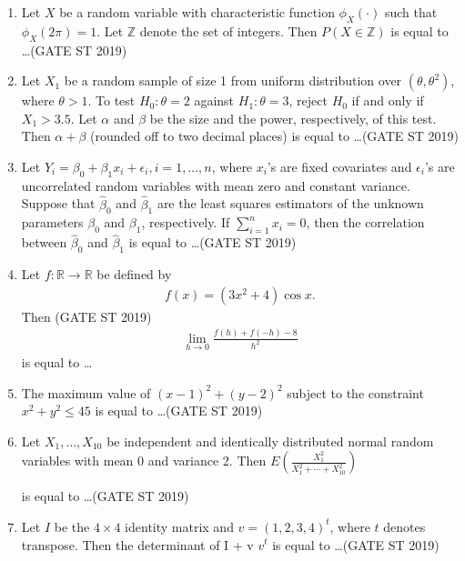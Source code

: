 \documentclass[journal]{IEEEtran}
\begin{document}
\begin{enumerate}[start=1]
\item Let \(X\) be a random variable with characteristic function \(\phi_X(\cdot)\) such that \(\phi_X(2 \pi) = 1\). Let \(\mathbb{Z}\) denote the set of integers. Then \(P(X \in \mathbb{Z})\) is equal to \ldots \hfill(GATE ST 2019)

\item Let \(X_1\) be a random sample of size 1 from uniform distribution over \((\theta, \theta^2)\), where \(\theta > 1\). To test \(H_0: \theta = 2\) against \(H_1: \theta = 3\), reject \(H_0\) if and only if \(X_1 > 3.5\). Let \(\alpha\) and \(\beta\) be the size and the power, respectively, of this test. Then \(\alpha + \beta\) (rounded off to two decimal places) is equal to \ldots \hfill(GATE ST 2019)

\item Let \(Y_i = \beta_0 + \beta_1 x_i + \epsilon_i, i=1, \ldots, n\), where \(x_i\)'s are fixed covariates and \(\epsilon_i\)'s are uncorrelated random variables with mean zero and constant variance. Suppose that \(\hat{\beta}_0\) and \(\hat{\beta}_1\) are the least squares estimators of the unknown parameters \(\beta_0\) and \(\beta_1\), respectively. If \(\sum_{i=1}^n x_i = 0\), then the correlation between \(\hat{\beta}_0\) and \(\hat{\beta}_1\) is equal to \ldots \hfill(GATE ST 2019)

\item Let \(f : \mathbb{R} \to \mathbb{R}\) be defined by
\begin{align*}
f(x) = (3x^2 + 4) \cos x. 
\end{align*}
Then \hfill(GATE ST 2019)
\begin{align*}
\lim_{h \to 0} \frac{f(h) + f(-h) - 8}{h^2}
\end{align*}
is equal to \ldots 

\item The maximum value of \((x - 1)^2 + (y - 2)^2\) subject to the constraint \(x^2 + y^2 \leq 45\) is equal to \ldots \hfill(GATE ST 2019)

\item Let \(X_1, \ldots, X_{10}\) be independent and identically distributed normal random variables with mean 0 and variance 2. Then $E\left(\frac{X_1^2}{X_1^2 + \cdots + X_{10}^2}\right)$

is equal to \ldots \hfill(GATE ST 2019)

\item Let \(I\) be the \(4 \times 4\) identity matrix and \(v = (1, 2, 3, 4)^t\), where \(t\) denotes transpose. Then the determinant of I + v $v^t$
is equal to \ldots \hfill(GATE ST 2019)


\end{enumerate}
\end{document}
